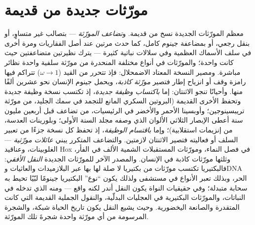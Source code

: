 \section{مورّثات جديدة من قديمة}

\begin{definition}\label{def:b3:molecular-evolution:duplication}
معظم المورّثات الجديدة نسخ من قديمة. و\emph{تضاعف المورّثة}
--- بتصالب غير متساوٍ، أو بنقل رجعي، أو بمضاعفة جينوم كامل،
كما حدث مرتين عند أصل الفقاريات ومرة أخرى في سلف الأسماك
العظمية وفي سلالات نباتية كثيرة --- يترك نظيرتين متضاعفتين
حيث كانت واحدة؛ والمورّثات في أنواع مختلفة المنحدرة من مورّثة
سلفية واحدة نظائر مباشرة. ومصير النسخة المعتاد
الاضمحلال: فإذ تتحرر من القيد ($\omega \to 1$) تتراكم فيها
رامزة وقف أو انزياح إطار فتصير \emph{مورّثة كاذبة}، ويحمل
جينوم الإنسان نحو عشرين ألفًا منها. وأحيانًا تنجو الاثنتان:
إما \emph{باكتساب وظيفة جديدة}، إذ تكتسب نسخة وظيفة جديدة
وتحفظ الأخرى القديمة (البروتين السكري المانع للتجمد في سمك
الجليد، من مورّثة تريبسينوجين؛ وأوبسينا الأحمر والأخضر في
الرئيسيات، من تضاعف قبل أربعين مليون سنة أعطى الإبصار
الثلاثي الألوان الذي وصفه مجلد السنة الأولى؛ وبلورينات
العدسة، من إنزيمات استقلابية)؛ وإما
\emph{باقتسام الوظيفة}، إذ تحفظ كل نسخة جزءًا من تعبير السلف
أو فعاليته فتصير الاثنتان لازمتين. والتضاعف المتكرر يبني
\emph{عائلات مورّثية} --- الغلوبينات، وعناقيد Hox في فصل
النماء، ومورّثات المستقبلات الشمية الألف في الفأر،
وثلثها مورّثات كاذبة في الإنسان. والمصدر الآخر للمورّثات
الجديدة \emph{النقل الأفقي}: فالبكتيريا تكتسب مورّثات من
بكتيريا لا صلة لها بها عبر البلازميدات والعاثيات وDNA الحر،
وبذلك تعبر  الأنواع في مستشفى ولذلك يكون
``نوع'' البكتيريا جينومًا لبّيًا تحيط به سحابة متبدلة؛ وفي
حقيقيات النواة يكون النقل أندر لكنه واقع --- ومنه  الذي
تدخله \emph{} في النباتات، والمورّثات البكتيرية
في العجليات البدلّية، والنقول الجملية القديمة التي كانت
المتقدرة والصانعة اليخضورية. وحيث يشيع النقل يكون تاريخ الحياة
شبكة، والشجرة المرسومة من أي مورّثة واحدة شجرةَ تلك المورّثة.
\end{definition}


